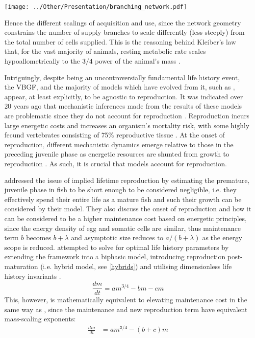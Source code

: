 \documentclass[a4paper]{article} %
\begin{document}
        \texttt{[image: ../Other/Presentation/branching\_network.pdf]}
        
        Hence the different scalings of acquisition and use, since the network geometry constrains the number of supply branches to scale differently (less steeply) from the total number of cells supplied. This is the reasoning behind Kleiber's law that, for the vast majority of animals, resting metabolic rate scales hypoallometrically to the $3/4$ power of the animal's mass \autocite{Kleiber1947}. 

        Intriguingly, despite being an uncontroversially fundamental life history event, the VBGF, and the majority of models which have evolved from it, such as \cite{West2001}, appear, at least explicitly, to be agnostic to reproduction. It was indicated over 20 years ago that mechanistic inferences made from the results of these models are problematic since they do not account for reproduction \autocite{Day1997, Marshall2019b}. Reproduction incurs large energetic costs and increases an organism's mortality risk, with some highly fecund vertebrates consisting of 75\% reproductive tissue \autocite{Parker2018}. At the onset of reproduction, different mechanistic dynamics emerge relative to those in the preceding juvenile phase as energetic resources are shunted from growth to reproduction \autocite{Day1997}. As such, it is crucial that models account for reproduction.

        \cite{West2001} addressed the issue of implied lifetime reproduction by estimating the premature, juvenile phase in fish to be short enough to be considered negligible, i.e. they effectively spend their entire life as a mature fish and such their growth can be considered by their model. They also discuss the onset of reproduction and how it can be considered to be a higher maintenance cost based on energetic principles, since the energy density of egg and somatic cells are similar, thus maintenance term $b$ becomes $b + \lambda$ and asymptotic size reduces to $a/(b+\lambda)$ as the energy scope is reduced. \cite{Charnov2001} attempted to solve for optimal life history parameters by extending the \cite{West2001} framework into a biphasic model, introducing reproduction post-maturation (i.e. hybrid model, see \ref{hybrids}) and utilising dimensionless life history invariants \autocite{Charnov1993}.
        \begin{equation}
            \frac{dm}{dt} = am^{3/4} - bm - cm \label{charnov_ogm}
        \end{equation}
        This, however, is mathematically equivalent to elevating maintenance cost in the same way as \cite{West2001}, since the maintenance and new reproduction term have equivalent mass-scaling exponents:
        \begin{align*}
            \frac{dm}{dt} &= am^{3/4} - (b+c)m
        \end{align*}
\end{document}
